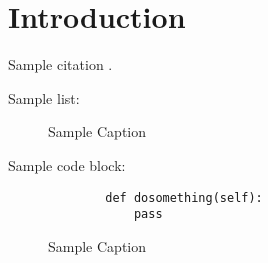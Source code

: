 \chapter{Introduction}

Sample citation \cite{_netconf_2014}.

Sample list:

\begin{figure}[h]
    \caption[Sample Title]{Sample Caption}
\end{figure}

Sample code block:

\begin{figure}[h]
    \begin{lstlisting}
        def dosomething(self):
            pass
    \end{lstlisting}
    \caption[Sample Title]{Sample Caption}
\end{figure}
